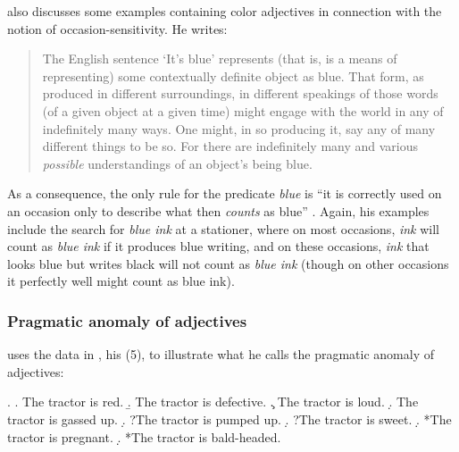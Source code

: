\citet{Travis:2000} also discusses some examples containing color
adjectives in connection with the notion of occasion-sensitivity. He
writes:
\begin{quotation}
The English sentence `It's blue' represents (that is, is a
means of representing) some contextually definite object as blue. That
form, as produced in different surroundings, in different speakings of
those words (of a given object at a given time) might engage with the
world in any of indefinitely many ways. One might, in so producing
it, say any of many different things to be so. For there are
indefinitely many and various \emph{possible} understandings of an
object's being blue. \citep[200, his emphasis]{Travis:2000} 
\end{quotation}
As a consequence, the
only rule for the predicate \emph{blue} is ``it is correctly used on
an occasion only to describe what then \emph{counts} as blue''
\citep[213, his emphasis]{Travis:2000}. Again, his examples include
the search for \emph{blue ink} at a stationer, where on most
occasions, \emph{ink} will count as \emph{blue ink} if it produces
blue writing, and on these occasions, \emph{ink} that looks blue but
writes black will not count as \emph{blue ink} (though on other
occasions it perfectly well might count as blue ink).

\subsubsection{Pragmatic anomaly of adjectives}
\label{sec:pragmatic_anomaly}
\citet[123]{Blutner:1998} uses the data in \Next, his (5), to illustrate what
he calls the pragmatic anomaly of adjectives:

\ex. 
\a. The tractor is red.
\b. The tractor is defective.
\c. The tractor is loud.
\d. The tractor is gassed up.
\d. \label{ex:tractor_pumped_up}
?The tractor is pumped up.
\d. \label{ex:tractor_sweet}
?The tractor is sweet.
\d. *The tractor is pregnant.
\d. *The tractor is bald-headed.


